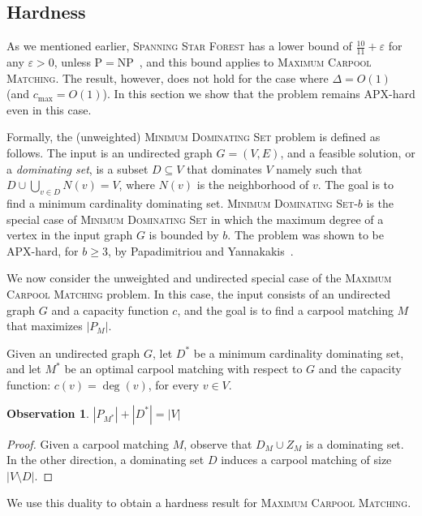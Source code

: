 \documentclass[11pt]{article}
\newtheorem{observation}[lemma]{Observation}
\newcommand{\abs}[1]{\left| #1 \right|}
\newcommand{\carpool}{\textsc{Maximum Carpool Matching}\xspace}
\newcommand{\cmax}{c_{\max}}
\newcommand{\eps}{\varepsilon}
\begin{document}

\subsection{Hardness}
\label{sec:hardness}

As we mentioned earlier, \textsc{Spanning Star Forest} has a lower
bound of $\frac{10}{11} + \eps$ for any $\eps > 0$, unless
P$=$NP~\cite{ChakrabartyGoel10}, and this bound applies to \carpool.
%
The result, however, does not hold for the case where $\Delta = O(1)$
(and $\cmax = O(1)$).  In this section we show that the problem remains
APX-hard even in this case.

Formally, the (unweighted) \textsc{Minimum Dominating Set} problem is
defined as follows.  The input is an undirected graph $G = (V,E)$, and
a feasible solution, or a \emph{dominating set}, is a subset
$D \subseteq V$ that dominates $V$ namely such that
$D \cup \bigcup_{v \in D} N(v) = V$, where $N(v)$ is the neighborhood
of $v$.  The goal is to find a minimum cardinality dominating set.
%
\textsc{Minimum Dominating Set-$b$} is the special case of
\textsc{Minimum Dominating Set} in which
the maximum degree of a vertex in the input graph $G$ is bounded by
$b$.  The problem was shown to be APX-hard, for $b \geq 3$, by
Papadimitriou and Yannakakis~\cite{PapYan88}.

We now consider the unweighted and undirected special case of
the \carpool problem.  In this case, the input consists of an
undirected graph $G$ and a capacity function $c$, and the goal is to
find a carpool matching $M$ that maximizes $\abs{P_M}$.

Given an undirected graph $G$, let $D^*$ be a minimum cardinality
dominating set, and let $M^*$ be an optimal carpool matching with
respect to $G$ and the capacity function: $c(v) = \deg(v)$, for every
$v \in V$.

\begin{observation}
$\abs{P_{M^*}} + \abs{D^*} = \abs{V}$ 
\end{observation}
\begin{proof}
Given a carpool matching $M$, observe that $D_M \cup Z_M$ is a
dominating set.  In the other direction, a dominating set $D$ induces
a carpool matching of size $\abs{V \setminus D}$.
\end{proof}

We use this duality to obtain a hardness result for \carpool.
\end{document}
